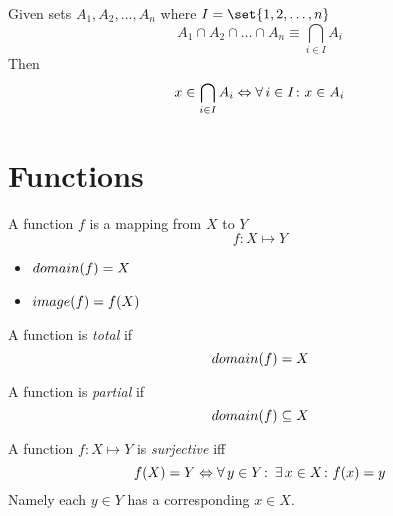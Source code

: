 \begin{definition}
    Given sets $A_1, A_2, \dots, A_n$ where $I = \set{1, 2, \dots, n}$
    \begin{equation}
        A_1 \cap A_2 \cap \dots \cap A_n \equiv \bigcap_{i \in I} A_i
    \end{equation}
    Then
    \begin{equation}
        x \in \bigcap_{i \in I} A_i \Leftrightarrow \operatorname{\forall} i \in I \colon x \in A_i
    \end{equation}
\end{definition}

\section{Functions}
\begin{definition}[Function]
    A function $f$ is a mapping from $X$ to $Y$
    \begin{equation}
        f \colon X \mapsto Y
    \end{equation}
    \begin{itemize}
        \item $\relax{domain}({f}) = X$
        \item $\relax{image}({f}) = f(X)$
    \end{itemize}
\end{definition}

\begin{definition}
    A function is \textit{total} if
    \begin{equation}
        \relax{domain}({f}) = X
    \end{equation}
\end{definition}

\begin{definition}
    A function is \textit{partial} if
    \begin{equation}
        \relax{domain}({f}) \subseteq X
    \end{equation}
\end{definition}

\begin{definition}[Surjection]
    A function $f \colon X \mapsto Y$ is \textit{surjective} iff
    \begin{equation}
        f(X) = Y \Leftrightarrow \operatorname{\forall} y \in Y \colon \operatorname{\exists} x \in X \colon f(x) = y
    \end{equation}
    Namely each $y \in Y$ has a corresponding $x \in X$.
\end{definition}

